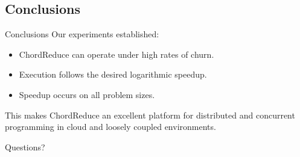 \documentclass[11pt]{beamer}
\begin{document}
\subsection{Conclusions}

\begin{frame}{Conclusions}
Our experiments established:
\begin{itemize}
	\item ChordReduce can operate under high rates of churn.
	\item Execution follows the desired logarithmic speedup.
	\item Speedup occurs on all problem sizes.
\end{itemize}

This makes ChordReduce an excellent platform for distributed and concurrent programming in cloud and loosely coupled environments.

\end{frame}


\begin{frame}{}
Questions?
\end{frame}



\end{document}
